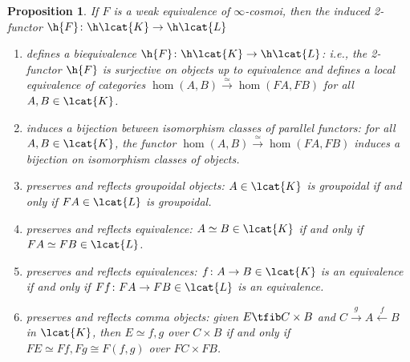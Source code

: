 \documentclass[12pt,reqno]{amsart}
\theoremstyle{plain}
\newtheorem{prop}[thm]{Proposition}
\theoremstyle{definition}
\theoremstyle{remark}
\numberwithin{equation}{subsection}
\begin{document}
\begin{prop}\label{prop:we} If $F$ is a weak equivalence of $\infty$-cosmoi, then the induced 2-functor $\h{F} \colon \h\lcat{K} \to \h\lcat{L}$
\begin{enumerate}[label=(\roman*)]
\item\label{itm:we-bi-equiv} defines a biequivalence $\h{F} \colon \h\lcat{K} \to \h\lcat{L}$: i.e., the 2-functor $\h{F}$ is surjective on objects up to equivalence and defines a local equivalence of categories $\hom(A,B) \stackrel{\simeq}{\longrightarrow}\hom(FA,FB)$ for all $A,B \in \lcat{K}$.
\item\label{itm:we-iso} induces a bijection between isomorphism classes of parallel functors: for all $A, B \in \lcat{K}$, the functor $\hom(A,B) \stackrel{\simeq}{\longrightarrow} \hom(FA,FB)$ induces a bijection on isomorphism classes of objects. 
\item\label{itm:we-groupoidal} preserves and reflects groupoidal objects: $A \in \lcat{K}$ is groupoidal if and only if $FA \in \lcat{L}$ is groupoidal.
\item\label{itm:we-equiv} preserves and reflects equivalence: $A \simeq B \in \lcat{K}$ if and only if $FA \simeq FB \in \lcat{L}$.
\item\label{itm:we-equivs}  preserves and reflects equivalences: $f \colon A \to B \in \lcat{K}$ is an equivalence if and only if $Ff \colon FA \to FB \in \lcat{L}$ is an equivalence.
\item\label{itm:we-comma} preserves and reflects comma objects: given $E \tfib C \times B$ and $C \xrightarrow{g} A \xleftarrow{f} B$ in $\lcat{K}$, then $E \simeq f \comma g$ over $C \times B$ if and only if  $FE \simeq Ff \comma Fg \cong F(f \comma g)$ over $FC \times FB$.
\end{enumerate}
\end{prop}
\end{document}
